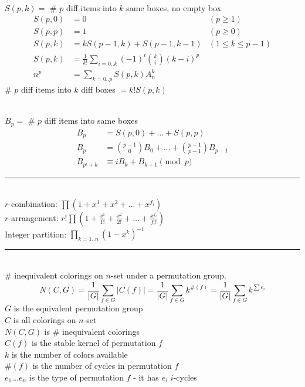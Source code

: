 \documentclass[10pt,letterpaper,landscape]{article}
\begin{document}
\begin{multicols}{2}
 \\ $S(p,k) =$ \# $p$ diff items into $k$ same boxes, no empty box
\begin{align*}
	S(p,0) &= 0 & (p \ge 1) \\
	S(p,p) &= 1 & (p \ge 0) \\
	S(p,k) &= k S(p-1,k) + S(p-1,k-1) & (1 \le k \le p-1) \\
	S(p,k) &= \frac{1}{k!} \sum_{i = 0..k}{(-1)^i \binom{k}{i} (k-i)^p} \\
	n^p &= \sum_{k = 0..p}{S(p,k) A_n^k}
\end{align*}
\# $p$ diff items into $k$ diff boxes $= k! S(p,k)$

 \\ $B_p =$ \# $p$ diff items into same boxes
\begin{align*}
	B_p &= S(p,0) + \hdots + S(p,p) \\
	B_p &= \binom{p-1}{0} B_0 + \hdots + \binom{p-1}{p-1} B_{p-1} \\
	B_{p^i+k} &\equiv i B_k + B_{k+1} \pmod{p}
\end{align*}

\noindent\rule{\linewidth}{1pt}

 \\ %
$r$-combination: $\prod{(1 + x^1 + x^2 + \hdots + x^{f_i})}$ \\
$r$-arrangement: $r! \prod{(1 + \frac{x^1}{1!} + \frac{x^2}{2!} + \hdots + \frac{x^{f_i}}{f_i!})}$ \\
Integer partition: $\prod_{k = 1..n}{(1-x^k)^{-1}}$

\noindent\rule{\linewidth}{1pt}

 \\
\# inequivalent colorings on $n$-set under a permutation group. 
\begin{equation*}
	N(C,G) = \frac{1}{|G|} \sum_{f \in G}{|C(f)|} = \frac{1}{|G|} \sum_{f \in G}{k^{\#(f)}} = \frac{1}{|G|} \sum_{f \in G}{k^{\sum{e_i}}}
\end{equation*}
$G$ is the equivalent permutation group \\
$C$ is all colorings on $n$-set \\
$N(C,G)$ is \# inequivalent colorings \\
$C(f)$ is the stable kernel of permutation $f$ \\
$k$ is the number of colors available \\
$\#(f)$ is the number of cycles in permutation $f$ \\
$e_1 \hdots e_n$ is the type of permutation $f$ - it has $e_i$ $i$-cycles 


\end{multicols}
\end{document}
